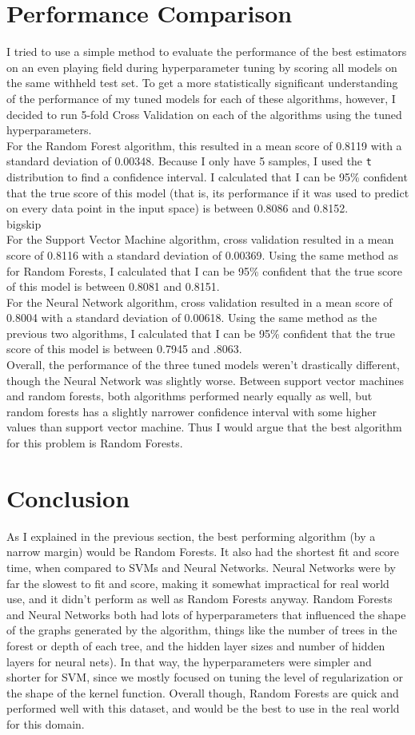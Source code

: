 \documentclass{article}
\begin{document}
\section*{Performance Comparison}
I tried to use a simple method to evaluate the performance of the best estimators on an even playing field during hyperparameter tuning by scoring all models on the same withheld test set. To get a more statistically significant understanding of the performance of my tuned models for each of these algorithms, however, I decided to run 5-fold Cross Validation on each of the algorithms using the tuned hyperparameters.
\bigskip \\For the Random Forest algorithm, this resulted in a mean score of 0.8119 with a standard deviation of 0.00348. Because I only have 5 samples, I used the \texttt{t} distribution to find a confidence interval. I calculated that I can be 95\% confident that the true score of this model (that is, its performance if it was used to predict on every data point in the input space) is between 0.8086 and 0.8152.
\\bigskip \\For the Support Vector Machine algorithm, cross validation resulted in a mean score of 0.8116 with a standard deviation of 0.00369. Using the same method as for Random Forests, I calculated that I can be 95\% confident that the true score of this model is between 0.8081 and 0.8151. 
\bigskip \\For the Neural Network algorithm, cross validation resulted in a mean score of 0.8004 with a standard deviation of 0.00618. Using the same method as the previous two algorithms, I calculated that I can be 95\% confident that the true score of this model is between 0.7945 and .8063.
\bigskip \\Overall, the performance of the three tuned models weren't drastically different, though the Neural Network was slightly worse. Between support vector machines and random forests, both algorithms performed nearly equally as well, but random forests has a slightly narrower confidence interval with some higher values than support vector machine. Thus I would argue that the best algorithm for this problem is Random Forests.
\section*{Conclusion}
As I explained in the previous section, the best performing algorithm (by a narrow margin) would be Random Forests. It also had the shortest fit and score time, when compared to SVMs and Neural Networks. Neural Networks were by far the slowest to fit and score, making it somewhat impractical for real world use, and it didn't perform as well as Random Forests anyway. Random Forests and Neural Networks both had lots of hyperparameters that influenced the shape of the graphs generated by the algorithm, things like the number of trees in the forest or depth of each tree, and the hidden layer sizes and number of hidden layers for neural nets). In that way, the hyperparameters were simpler and shorter for SVM, since we mostly focused on tuning the level of regularization or the shape of the kernel function. Overall though, Random Forests are quick and performed well with this dataset, and would be the best to use in the real world for this domain.
\end{document}
